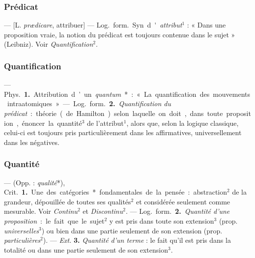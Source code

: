 \subsubsection{Prédicat}
 — [L. {\it prædicare}, attribuer] — \si{Log.} \si{form.} Syn.
d'{\it attribut}$^1$ : « Dans une proposition vraie, la notion du prédicat
est toujours contenue dans le sujet » (Leibniz). Voir
{\it Quantification}$^2$.

\subsubsection{Quantification}
 — \si{Phys.} {\bf 1.} Attribution d’un {\it quantum}* : «
La quantification des mouvements intraatomiques ». — \si{Log.} \si{form.}
{\bf 2.} {\it Quantification du prédicat} : théorie (de Hamilton) selon
laquelle on doit,
dans toute proposition, énoncer la quantité$^3$ de l’attribut$^1$, alors que,
selon la logique classique, celui-ci est toujours pris particulièrement dans
les affirmatives, universellement dans les négatives.

\subsubsection{Quantité}
 — (Opp. : {\it qualité}*), \si{Crit.} {\bf 1.} Une des
catégories* fondamentales de la pensée : abstraction$^2$ de la grandeur,
dépouillée de toutes ses qualités$^2$ et considérée seulement comme
mesurable. Voir {\it Continu}$^2$ et {\it Discontinu}$^2$. — \si{Log.}
\si{form.} {\bf 2.} {\it Quantité d'une proposition} : le fait que le
sujet$^2$ y est pris dans toute son extension$^3$ (prop.
{\it universelles}$^3$) ou bien dans une partie seulement de son extension
(prop. {\it particulières}$^2$). — {\it Ext.} {\bf 3.} {\it Quantité d'un
terme} : le fait qu'il est pris dans la totalité ou dans une partie seulement
de son extension$^3$.

